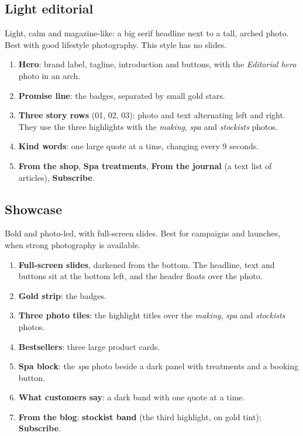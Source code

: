 \documentclass[11pt,a4paper]{article}
\begin{document}
\subsection{Light editorial}
Light, calm and magazine-like: a big serif headline next to a tall, arched photo. Best with good lifestyle photography. This style has no slides.
\begin{enumerate}
  \item \textbf{Hero}: brand label, tagline, introduction and buttons, with the \emph{Editorial hero} photo in an arch.
  \item \textbf{Promise line}: the badges, separated by small gold stars.
  \item \textbf{Three story rows} (01, 02, 03): photo and text alternating left and right. They use the three highlights with the \emph{making}, \emph{spa} and \emph{stockists} photos.
  \item \textbf{Kind words}: one large quote at a time, changing every 9 seconds.
  \item \textbf{From the shop}, \textbf{Spa treatments}, \textbf{From the journal} (a text list of articles), \textbf{Subscribe}.
\end{enumerate}

\subsection{Showcase}
Bold and photo-led, with full-screen slides. Best for campaigns and launches, when strong photography is available.
\begin{enumerate}
  \item \textbf{Full-screen slides}, darkened from the bottom. The headline, text and buttons sit at the bottom left, and the header floats over the photo.
  \item \textbf{Gold strip}: the badges.
  \item \textbf{Three photo tiles}: the highlight titles over the \emph{making}, \emph{spa} and \emph{stockists} photos.
  \item \textbf{Bestsellers}: three large product cards.
  \item \textbf{Spa block}: the \emph{spa} photo beside a dark panel with treatments and a booking button.
  \item \textbf{What customers say}: a dark band with one quote at a time.
  \item \textbf{From the blog}; \textbf{stockist band} (the third highlight, on gold tint); \textbf{Subscribe}.
\end{enumerate}
\end{document}
